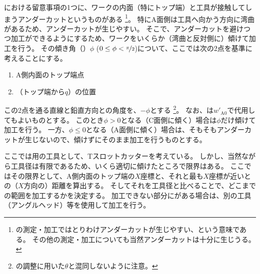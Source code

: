 \clearpage
\DimpleMilling における留意事項の1つに、ワークの内面（特にトップ端）と工具が接触してしまうアンダーカットというものがある
\footnote{\Dimple の測定・加工ではとりわけアンダーカットが生じやすい、という意味である。
その他の測定・加工についても当然アンダーカットは十分に生じうる。}。
特にA面側は工具へ向かう方向に湾曲があるため、アンダーカットが生じやすい。
そこで、アンダーカットを避けつつ加工ができるようにするため、ワークをいくらか（湾曲と反対側に）傾けて加工を行う。
その傾き角（\textbf{\DimpleAngle}）$\phi$ ($0 \leq \phi < \nicefrac\pi2$)について、ここでは次の2点を基準に考えることにする。
\begin{tcolorbox}[title=A面の\Dimple, fonttitle=\gtfamily\bfseries]
\begin{enumerate}[label=\sarrow]
\item A側内面のトップ端点
\item \AFaceDimpleFirstRow（トップ端から$q$）の位置
\end{enumerate}
\end{tcolorbox}\noindent
この2点を通る直線と鉛直方向との角度を、\DimpleAngle$-\phi$とする
\footnote{\AlocationLength の調整に用いた\AlocationAngle$\theta$と混同しないように注意。}。
なお、\TopEndACID は$w'_{\mathrm A0}$で代用してもよいものとする。
このとき$\phi > 0$となる（C面側に傾く）場合は$\phi$だけ傾けて加工を行う。
一方、$\phi \leq 0$となる（A面側に傾く）場合は、そもそもアンダーカットが生じないので、傾けずにそのまま加工を行うものとする。
\begin{hosoku}
ここでは\DimpleMilling 用の工具として、Tスロットカッターを考えている。
しかし、当然ながら工具径は有限であるため、いくら適切に傾けたところで限界はある。
ここではその限界として、A側内面のトップ端の$X$座標と、それと最も$X$座標が近い\Dimple との（$X$方向の）距離を算出する。
そしてそれを工具径と比べることで、どこまでの範囲を加工するかを決定する。
加工できない部分に\Dimple がある場合は、別の工具（アングルヘッド）等を使用して加工を行う。
\end{hosoku}
